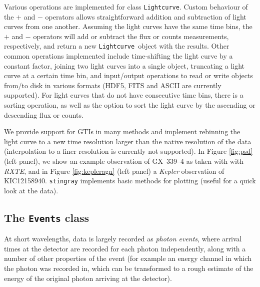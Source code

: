 \documentclass[twocolumn]{aastex62}
\newcommand{\project}[1]{\textsl{#1}\xspace}
\newcommand{\rxte}{\project{RXTE}\xspace}
\newcommand{\stingray}{\texttt{stingray}\xspace}
\newcommand{\lightcurve}{\texttt{Lightcurve}\xspace}
\begin{document}
Various operations are implemented for class \lightcurve. 
Custom behaviour of the $+$ and $-$ operators allows straightforward addition and subtraction of light curves from one another. 
Assuming the light curves have the same time bins, the $+$ and $-$ operators will add or subtract the flux or counts measurements, respectively, and return a new \lightcurve\ object with the results. 
Other common operations implemented include time-shifting the light curve by a constant factor, joining two light curves into a single object, truncating a light curve at a certain time bin, and input/output operations to read or write objects from/to disk in various formats (HDF5, FITS and ASCII are currently supported). 
For light curves that do not have consecutive time bins, there is a sorting operation, as well as the option to sort the light curve by the ascending or descending flux or counts. 

We provide support for GTIs in many methods and implement rebinning the light curve to a new time resolution larger than the native resolution of the data (interpolation to a finer resolution is currently not supported). 
In Figure \ref{fig:psd} (left panel), we show an example observation of GX~339--4 as taken with with \rxte, and in Figure \ref{fig:kepleragn} (left panel) a \textit{Kepler} observation of KIC12158940.
\stingray implements basic methods for plotting (useful for a quick look at the data).



\subsection{The \texttt{Events} class}

At short wavelengths, data is largely recorded as \textit{photon events}, where arrival times at the detector are recorded for each photon independently, along with a number of other properties of the event (for example an energy channel in which the photon was recorded in, which can be transformed to a rough estimate of the energy of the original photon arriving at the detector).
\end{document}
